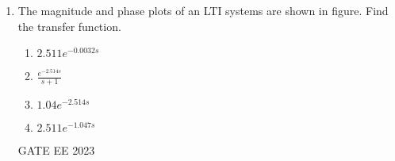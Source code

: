 \begin{enumerate}[label=\thechapter.\arabic*,ref=\thechapter.\theenumi]
 \item The magnitude and phase plots of an LTI systems are shown in figure. Find the transfer function.
    
    \begin{enumerate}
        \item $2.511 e^{-0.0032s}$\\
        \item $\frac{e^{-2.514s}}{s+1}$\\
        \item $1.04e^{-2.514s}$\\
        \item $2.511 e^{-1.047s}$\\
    \end{enumerate} \hfill{GATE EE 2023} \\
    
    \solution
 
\end{enumerate}

